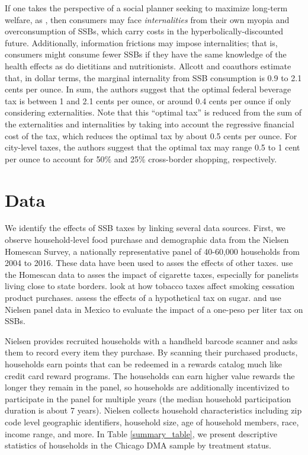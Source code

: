 \documentclass[12pt]{article}
\begin{document}
If one takes the perspective of a social planner seeking to maximize long-term welfare, as \textcite{allcott2019regressive}, then consumers may face \textit{internalities} from their own myopia and overconsumption of SSBs, which carry costs in the hyperbolically-discounted future. Additionally, information frictions may impose internalities; that is, consumers might consume fewer SSBs if they have the same knowledge of the health effects as do dietitians and nutritionists. Allcott and coauthors estimate that, in dollar terms, the marginal internality from SSB consumption is 0.9 to 2.1 cents per ounce. In sum, the authors suggest that the optimal federal beverage tax is between 1 and 2.1 cents per ounce, or around 0.4 cents per ounce if only considering externalities. Note that this ``optimal tax'' is reduced from the sum of the externalities and internalities by taking into account the regressive financial cost of the tax, which reduces the optimal tax by about 0.5 cents per ounce. For city-level taxes, the authors suggest that the optimal tax may range 0.5 to 1 cent per ounce to account for 50\% and 25\% cross-border shopping, respectively.

\section{Data} \label{data}

We identify the effects of SSB taxes by linking several data sources. First, we observe household-level food purchase and demographic data from the Nielsen Homescan Survey, a nationally representative panel of 40-60,000 households from 2004 to 2016. These data have been used to asses the effects of other taxes. \textcite{harding2012heterogeneous} use the Homescan data to asses the impact of cigarette taxes, especially for panelists living close to state borders. \textcite{cotti2016effects} look at how tobacco taxes affect smoking cessation product purchases. \textcite{dharmasena2012intended} assess the effects of a hypothetical tax on sugar. \textcite{colchero2016beverage} and \textcite{colchero2017mexico} use Nielsen panel data in Mexico to evaluate the impact of a one-peso per liter tax on SSBs.

Nielsen provides recruited households with a handheld barcode scanner and asks them to record every item they purchase. By scanning their purchased products, households earn points that can be redeemed in a rewards catalog much like credit card reward programs. The households can earn higher value rewards the longer they remain in the panel, so households are additionally incentivized to participate in the panel for multiple years (the median household participation duration is about 7 years). Nielsen collects household characteristics including zip code level geographic identifiers, household size, age of household members, race, income range, and more. In Table \ref{summary_table}, we present descriptive statistics of households in the Chicago DMA sample by treatment status.
\end{document}

